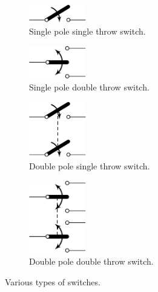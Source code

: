 \documentclass{report}
\begin{document}
\begin{figure}[H]
    \centering
    \begin{subfigure}{0.47\linewidth}
        \centering
        \includegraphics[width=2.5cm]{figures/spst.pdf}
        \caption{Single pole single throw switch.}
    \end{subfigure}
    \begin{subfigure}{0.47\linewidth}
        \centering
        \includegraphics[width=2.5cm]{figures/spdt.pdf}
        \caption{Single pole double throw switch.}
    \end{subfigure}

    \vspace*{5ex}
    \begin{subfigure}{0.47\linewidth}
        \centering
        \includegraphics[width=2.5cm]{figures/dpst.pdf}
        \caption{Double pole single throw switch.}
    \end{subfigure}
    \begin{subfigure}{0.47\linewidth}
        \centering
        \includegraphics[width=2.5cm]{figures/dpdt.pdf}
        \caption{Double pole double throw switch.}
    \end{subfigure}
    \caption{Various types of switches.}
\end{figure}
\end{document}
